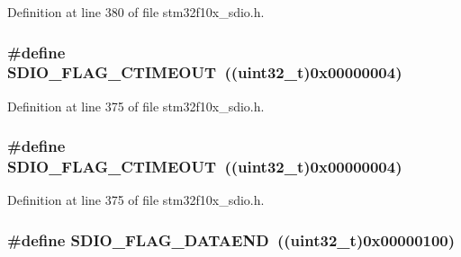 Definition at line 380 of file stm32f10x\+\_\+sdio.\+h.

\subsubsection[{\texorpdfstring{S\+D\+I\+O\+\_\+\+F\+L\+A\+G\+\_\+\+C\+T\+I\+M\+E\+O\+UT}{SDIO_FLAG_CTIMEOUT}}]{\setlength{\rightskip}{0pt plus 5cm}\#define S\+D\+I\+O\+\_\+\+F\+L\+A\+G\+\_\+\+C\+T\+I\+M\+E\+O\+UT~(({\bf uint32\+\_\+t})0x00000004)}\hypertarget{group___s_d_i_o___flags_ga7389f64ff6cfa4f459bf852b5faede30}{}\label{group___s_d_i_o___flags_ga7389f64ff6cfa4f459bf852b5faede30}


Definition at line 375 of file stm32f10x\+\_\+sdio.\+h.

\subsubsection[{\texorpdfstring{S\+D\+I\+O\+\_\+\+F\+L\+A\+G\+\_\+\+C\+T\+I\+M\+E\+O\+UT}{SDIO_FLAG_CTIMEOUT}}]{\setlength{\rightskip}{0pt plus 5cm}\#define S\+D\+I\+O\+\_\+\+F\+L\+A\+G\+\_\+\+C\+T\+I\+M\+E\+O\+UT~(({\bf uint32\+\_\+t})0x00000004)}\hypertarget{group___s_d_i_o___flags_ga7389f64ff6cfa4f459bf852b5faede30}{}\label{group___s_d_i_o___flags_ga7389f64ff6cfa4f459bf852b5faede30}


Definition at line 375 of file stm32f10x\+\_\+sdio.\+h.

\subsubsection[{\texorpdfstring{S\+D\+I\+O\+\_\+\+F\+L\+A\+G\+\_\+\+D\+A\+T\+A\+E\+ND}{SDIO_FLAG_DATAEND}}]{\setlength{\rightskip}{0pt plus 5cm}\#define S\+D\+I\+O\+\_\+\+F\+L\+A\+G\+\_\+\+D\+A\+T\+A\+E\+ND~(({\bf uint32\+\_\+t})0x00000100)}\hypertarget{group___s_d_i_o___flags_gaaacb2f6207c149e05f8bdd70e5d49926}{}\label{group___s_d_i_o___flags_gaaacb2f6207c149e05f8bdd70e5d49926}


